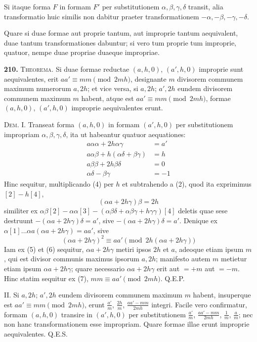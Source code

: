 \documentclass[12pt,a4paper]{article}
\theoremstyle{plain}
\theoremstyle{definition}
\theoremstyle{remark}
\begin{document}
Si itaque forma $F$ in formam $F'$ per substitutionem $\alpha,\beta,\gamma,\delta$ transit, alia transformatio huic similis non dabitur praeter transformationem $-\alpha,-\beta,-\gamma,-\delta$.

Quare si duae formae aut proprie tantum, aut improprie tantum aequivalent, duae tantum transformationes dabuntur; si vero tum proprie tum improprie, quatuor, nempe duae propriae duaeque impropriae.

\textbf{210.} \textsc{Theorema.} Si duae formae reductae $(a,h,0)$, $(a',h,0)$ improprie sunt aequivalentes, erit $aa'\equiv mm\pmod{2mh}$, designante $m$ divisorem communem maximum numerorum $a,2h$; et vice versa, si $a,2h$; $a',2h$ eundem divisorem communem maximum $m$ habent, atque est $aa'\equiv mm\pmod{2mh}$, formae $(a,h,0)$, $(a',h,0)$ improprie aequivalentes erunt.

\textsc{Dem.} I. Transeat forma $(a,h,0)$ in formam $(a',h,0)$ per substitutionem impropriam $\alpha,\beta,\gamma,\delta$, ita ut habeantur quatuor aequationes:
\begin{align*}
a\alpha\alpha+2h\alpha\gamma &= a' \tag{1} \\
a\alpha\beta+h(\alpha\delta+\beta\gamma) &= h \tag{2} \\
a\beta\beta+2h\beta\delta &= 0 \tag{3} \\
\alpha\delta-\beta\gamma &= -1 \tag{4}
\end{align*}
Hinc sequitur, multiplicando (4) per $h$ et subtrahendo a (2), quod ita exprimimus $[2]-h[4]$,
\begin{equation*}
(\alpha a+2h\gamma)\beta=2h \tag{5}
\end{equation*}
similiter ex $\alpha\beta[2]-\alpha\alpha[3]-(\alpha\beta\delta+\alpha\beta\gamma+h\gamma\gamma)[4]$ deletis quae sese destruunt $-(\alpha a+2h\gamma)\delta=a'$, sive $-(\alpha a+2h\gamma)\delta=a'$. Denique ex $\alpha[1]\ldots\alpha a(\alpha a+2h\gamma)=aa'$, sive
\begin{equation*}
(\alpha a+2h\gamma)^2\equiv aa'\pmod{2h(\alpha a+2h\gamma)} \tag{7}
\end{equation*}
Iam ex (5) et (6) sequitur, $\alpha a+2h\gamma$ metiri ipsos $2h$ et $a$, adeoque etiam ipsum $m$, qui est divisor communis maximus ipsorum $a,2h$; manifesto autem $m$ metietur etiam ipsum $\alpha a+2h\gamma$; quare necessario $\alpha a+2h\gamma$ erit aut $=+m$ aut $=-m$. Hinc statim sequitur ex (7), $mm\equiv aa'\pmod{2mh}$. Q.E.P.

II. Si $a,2h$; $a',2h$ eundem divisorem communem maximum $m$ habent, insuperque est $aa'\equiv mm\pmod{2mh}$, erunt $\frac{a'}{m}$, $\frac{2h}{m}$, $\frac{aa'-mm}{2mh}$ integri. Facile vero confirmatur, formam $(a,h,0)$ transire in $(a',h,0)$ per substitutionem $\frac{a'}{m}$, $\frac{aa'-mm}{2mh}$, $\frac{1}{m}$, $\frac{a}{m}$; nec non hanc transformationem esse impropriam. Quare formae illae erunt improprie aequivalentes. Q.E.S.
\end{document}

